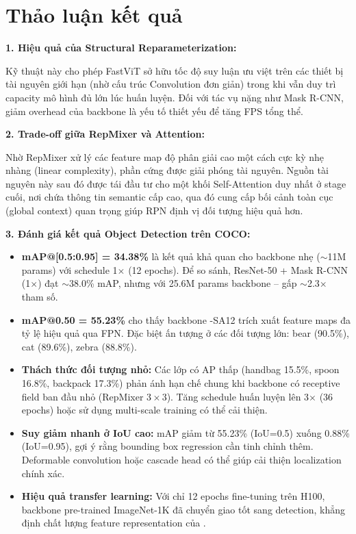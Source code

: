 \section{Thảo luận kết quả}
\label{sec:discussion}

\textbf{1. Hiệu quả của Structural Reparameterization:}

Kỹ thuật này cho phép FastViT sở hữu tốc độ suy luận ưu việt trên các thiết bị tài nguyên giới hạn (nhờ cấu trúc Convolution đơn giản) trong khi vẫn duy trì capacity mô hình đủ lớn lúc huấn luyện. Đối với tác vụ nặng như Mask R-CNN, giảm overhead của backbone là yếu tố thiết yếu để tăng FPS tổng thể.

\textbf{2. Trade-off giữa RepMixer và Attention:}

Nhờ RepMixer xử lý các feature map độ phân giải cao một cách cực kỳ nhẹ nhàng (linear complexity), phần cứng được giải phóng tài nguyên. Nguồn tài nguyên này sau đó được tái đầu tư cho một khối Self-Attention duy nhất ở stage cuối, nơi chứa thông tin semantic cấp cao, qua đó cung cấp bối cảnh toàn cục (global context) quan trọng giúp RPN định vị đối tượng hiệu quả hơn.

\textbf{3. Đánh giá kết quả Object Detection trên COCO:}

\begin{itemize}
    \item \textbf{mAP@[0.5:0.95] = 34.38\%} là kết quả khả quan cho backbone nhẹ ($\sim$11M params) với schedule 1$\times$ (12 epochs). Để so sánh, ResNet-50 + Mask R-CNN (1$\times$) đạt $\sim$38.0\% mAP, nhưng với 25.6M params backbone -- gấp $\sim$2.3$\times$ tham số.
    
    \item \textbf{mAP@0.50 = 55.23\%} cho thấy backbone \fastvit{}-SA12 trích xuất feature maps đa tỷ lệ hiệu quả qua FPN. Đặc biệt ấn tượng ở các đối tượng lớn: bear (90.5\%), cat (89.6\%), zebra (88.8\%).
    
    \item \textbf{Thách thức đối tượng nhỏ:} Các lớp có AP thấp (handbag 15.5\%, spoon 16.8\%, backpack 17.3\%) phản ánh hạn chế chung khi backbone có receptive field ban đầu nhỏ (RepMixer $3 \times 3$). Tăng schedule huấn luyện lên 3$\times$ (36 epochs) hoặc sử dụng multi-scale training có thể cải thiện.
    
    \item \textbf{Suy giảm nhanh ở IoU cao:} mAP giảm từ 55.23\% (IoU=0.5) xuống 0.88\% (IoU=0.95), gợi ý rằng bounding box regression cần tinh chỉnh thêm. Deformable convolution hoặc cascade head có thể giúp cải thiện localization chính xác.
    
    \item \textbf{Hiệu quả transfer learning:} Với chỉ 12 epochs fine-tuning trên H100, backbone pre-trained ImageNet-1K đã chuyển giao tốt sang detection, khẳng định chất lượng feature representation của \fastvit{}.
\end{itemize}
